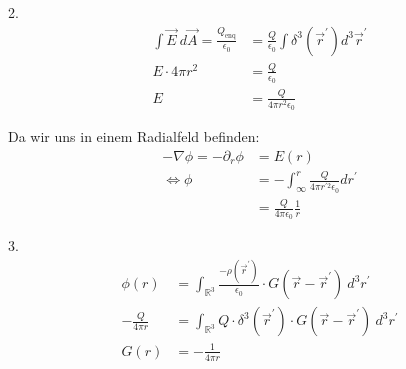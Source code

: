 \documentclass[11pt a4paper]{article}
\newcommand{\epsz}{\epsilon_0}
\begin{document}
2.
\begin{align*}
	\int \vec E \ d\vec A = \frac{Q_\text{enq}}{\epsz}
	&= \frac{Q}{\epsz} \int \delta^3(\vec r^\prime) d^3 \vec r^\prime \\
	E \cdot 4\pi r^2 &= \frac{Q}{\epsz} \\
	E &= \frac{Q}{4\pi r^2 \epsz}
\end{align*}

Da wir uns in einem Radialfeld befinden:
\begin{align*}
	-\nabla \phi = -\partial_r \phi
	&= E(r) \\
	\Leftrightarrow
	\phi &= - \int_\infty^r \frac{Q}{4\pi r^{\prime 2} \epsz} dr^\prime
	\\
	&= \frac{Q}{4\pi\epsz} \frac1r
\end{align*}

3.
\begin{align*}
	\phi(r) 
	&= \int_{\mathbb{R}^3} \frac{-\rho(\vec r^\prime)}{\epsz} 
	\cdot G(\vec r - \vec r^\prime) \ d^3r^\prime \\
	- \frac{Q}{4\pi r}
	&= \int_{\mathbb{R}^3} Q \cdot \delta^3(\vec r^\prime)
	\cdot G(\vec r - \vec r^\prime) \ d^3r^\prime \\
	G(r) &= -\frac1{4\pi r}
\end{align*}
\end{document}

